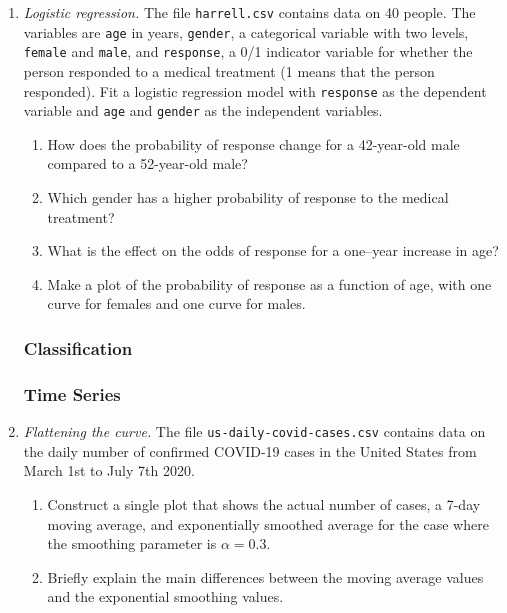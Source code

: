 \begin{enumerate}
\item \emph{Logistic regression.} The file \texttt{harrell.csv}
contains data on 40 people. The variables are \texttt{age} in years,
\texttt{gender}, a categorical variable with two levels, \texttt{female}
and \texttt{male}, and \texttt{response}, a 0/1 indicator variable for
whether the person responded to a medical treatment (1 means that the
person responded). Fit a logistic regression model with
\texttt{response} as the dependent variable and \texttt{age} and
\texttt{gender} as the independent variables.

\begin{enumerate}
\item How does the probability of response change for a 42-year-old male
compared to a 52-year-old male?
\item Which gender has a higher probability of response to the medical
treatment?
\item What is the effect on the odds of response for a one--year
increase in age?
\item Make a plot of the probability of response as a function
of age, with one curve for females and one curve for males.
\end{enumerate}

\subsubsection*{Classification}

\subsubsection*{Time Series}

\item \emph{Flattening the curve.}  The file
  \texttt{us-daily-covid-cases.csv} contains data on the daily number
  of confirmed COVID-19 cases in the United States from March 1st to
  July 7th 2020.

\begin{enumerate}
\item Construct a single plot that shows the actual number of cases,
a 7-day moving average, and exponentially smoothed average for 
the case where the smoothing parameter is $\alpha=0.3$. 
\item Briefly explain the main differences between the moving average
values and the exponential smoothing values.
\end{enumerate}


\end{enumerate}
